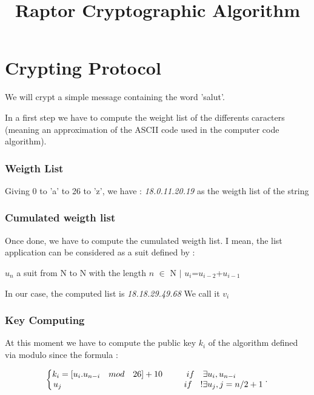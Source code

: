 \documentclass{article}
\begin{document}
\title{Raptor Cryptographic Algorithm}
\newpage
\part{Crypting Protocol}

\begin{flushleft}
We will crypt a simple message containing the word 'salut'.

In a first step we have to compute the weight list of the differents caracters (meaning an approximation of the ASCII code used in the computer code algorithm).
\end{flushleft}

\section*{Weigth List}
\begin{flushleft}
Giving 0 to 'a' to 26 to 'z', we have : \textit{18.0.11.20.19} as the weigth list of the string
\end{flushleft}

\section*{Cumulated weigth list}

\begin{flushleft}
Once done, we have to compute the cumulated weigth list.
I mean, the list application can be considered as a suit defined by : 
\end{flushleft}

\begin{center}
$u_{n}$ a suit from N to N with the length $n$ $ \in $ N \quad $ \vert $ \quad $u_{i}$=$u_{i-2}$+$u_{i-1}$
\end{center}

In our case, the computed list is \textit{18.18.29.49.68}
We call it $v_{i}$
\section*{Key Computing}

\begin{flushleft}
At this moment we have to compute the public key $k_{i}$ of the algorithm defined via modulo since the formula :
\end{flushleft}

\begin{equation}
\centering
\left\{\begin{array}{@{}l@{}}
k_{i}=[u_{i}.u_{n-i} \quad mod \quad 26 ] + 10  \hspace*{1cm} if \quad \exists u_{i} , u_{n-i}  \\
\left. u_{j}  \; \hspace*{5cm} if \quad !\exists u_{j}, j = n/2 + 1
\right.\end{array}\,.
\right.\end{equation}
\end{document}
